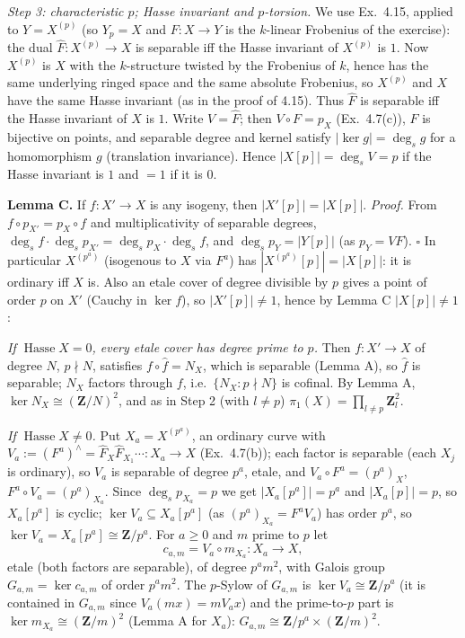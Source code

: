 \documentclass[11pt]{article}
\begin{document}
\emph{Step 3: characteristic $p$; Hasse invariant and $p$-torsion.} We use Ex.~4.15, applied to $Y=X^{(p)}$ (so $Y_p=X$ and $F:X\to Y$ is the $k$-linear Frobenius of the exercise): the dual $\hat F:X^{(p)}\to X$ is separable iff the Hasse invariant of $X^{(p)}$ is $1$. Now $X^{(p)}$ is $X$ with the $k$-structure twisted by the Frobenius of $k$, hence has the same underlying ringed space and the same absolute Frobenius, so $X^{(p)}$ and $X$ have the same Hasse invariant (as in the proof of 4.15). Thus $\hat F$ is separable iff the Hasse invariant of $X$ is $1$. Write $V=\hat F$; then $V\circ F=p_X$ (Ex.~4.7(c)), $F$ is bijective on points, and separable degree and kernel satisfy $|\ker g|=\deg_sg$ for a homomorphism $g$ (translation invariance). Hence $|X[p]|=\deg_sV=p$ if the Hasse invariant is $1$ and $=1$ if it is $0$.

\textbf{Lemma C.} If $f:X'\to X$ is any isogeny, then $|X'[p]|=|X[p]|$. \emph{Proof.} From $f\circ p_{X'}=p_X\circ f$ and multiplicativity of separable degrees, $\deg_sf\cdot\deg_sp_{X'}=\deg_sp_X\cdot\deg_sf$, and $\deg_sp_Y=|Y[p]|$ (as $p_Y=VF$). \hfill$\square$
In particular $X^{(p^a)}$ (isogenous to $X$ via $F^a$) has $|X^{(p^a)}[p]|=|X[p]|$: it is ordinary iff $X$ is. Also an etale cover of degree divisible by $p$ gives a point of order $p$ on $X'$ (Cauchy in $\ker f$), so $|X'[p]|\ne1$, hence by Lemma C $|X[p]|\ne1$:

\emph{If $\operatorname{Hasse}X=0$, every etale cover has degree prime to $p$.} Then $f:X'\to X$ of degree $N$, $p\nmid N$, satisfies $f\circ\hat f=N_X$, which is separable (Lemma A), so $\hat f$ is separable; $N_X$ factors through $f$, i.e.\ $\{N_X:p\nmid N\}$ is cofinal. By Lemma A, $\ker N_X\cong(\mathbf Z/N)^2$, and as in Step 2 (with $l\ne p$) $\pi_1(X)=\prod_{l\ne p}\mathbf Z_l^2$.

\emph{If $\operatorname{Hasse}X\ne0$.} Put $X_a=X^{(p^a)}$, an ordinary curve with $V_a:=(F^a)^\wedge=\hat F_{X}\hat F_{X_1}\cdots:X_a\to X$ (Ex.~4.7(b)); each factor is separable (each $X_j$ is ordinary), so $V_a$ is separable of degree $p^a$, etale, and $V_a\circ F^a=(p^a)_X$, $F^a\circ V_a=(p^a)_{X_a}$. Since $\deg_sp_{X_a}=p$ we get $|X_a[p^a]|=p^a$ and $|X_a[p]|=p$, so $X_a[p^a]$ is cyclic; $\ker V_a\subseteq X_a[p^a]$ (as $(p^a)_{X_a}=F^aV_a$) has order $p^a$, so $\ker V_a=X_a[p^a]\cong\mathbf Z/p^a$. For $a\ge0$ and $m$ prime to $p$ let
\[ c_{a,m}=V_a\circ m_{X_a}:X_a\to X, \]
etale (both factors are separable), of degree $p^am^2$, with Galois group $G_{a,m}=\ker c_{a,m}$ of order $p^am^2$. The $p$-Sylow of $G_{a,m}$ is $\ker V_a\cong\mathbf Z/p^a$ (it is contained in $G_{a,m}$ since $V_a(m x)=mV_ax$) and the prime-to-$p$ part is $\ker m_{X_a}\cong(\mathbf Z/m)^2$ (Lemma A for $X_a$): $G_{a,m}\cong\mathbf Z/p^a\times(\mathbf Z/m)^2$.
\end{document}
